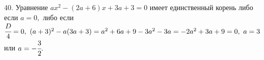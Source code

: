40. Уравнение $ax^2-(2a+6)x+3a+3=0$ имеет единственный корень либо если $a=0,$ либо если $\cfrac{D}{4}=0,\ (a+3)^2-a(3a+3)=a^2+6a+9-3a^2-3a=-2a^2+3a+9=0,\
a=3$ или $a=-\cfrac{3}{2}.$\\
